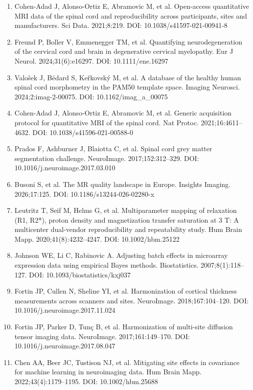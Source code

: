 \documentclass[12pt,a4paper]{article}
\begin{document}
\begin{enumerate}[nosep,leftmargin=*]
\item Cohen-Adad J, Alonso-Ortiz E, Abramovic M, et al. Open-access quantitative MRI data of the spinal cord and reproducibility across participants, sites and manufacturers. Sci Data. 2021;8:219. DOI: 10.1038/s41597-021-00941-8
\item Freund P, Boller V, Emmenegger TM, et al. Quantifying neurodegeneration of the cervical cord and brain in degenerative cervical myelopathy. Eur J Neurol. 2024;31(6):e16297. DOI: 10.1111/ene.16297
\item Valo\v{s}ek J, B\'edard S, Ke\v{r}kovsk\'y M, et al. A database of the healthy human spinal cord morphometry in the PAM50 template space. Imaging Neurosci. 2024;2:imag-2-00075. DOI: 10.1162/imag\_a\_00075
\item Cohen-Adad J, Alonso-Ortiz E, Abramovic M, et al. Generic acquisition protocol for quantitative MRI of the spinal cord. Nat Protoc. 2021;16:4611--4632. DOI: 10.1038/s41596-021-00588-0
\item Prados F, Ashburner J, Blaiotta C, et al. Spinal cord grey matter segmentation challenge. NeuroImage. 2017;152:312--329. DOI: 10.1016/j.neuroimage.2017.03.010
\item Busoni S, et al. The MR quality landscape in Europe. Insights Imaging. 2026;17:125. DOI: 10.1186/s13244-026-02280-x
\item Leutritz T, Seif M, Helms G, et al. Multiparameter mapping of relaxation (R1, R2*), proton density and magnetization transfer saturation at 3 T: A multicenter dual-vendor reproducibility and repeatability study. Hum Brain Mapp. 2020;41(8):4232--4247. DOI: 10.1002/hbm.25122
\item Johnson WE, Li C, Rabinovic A. Adjusting batch effects in microarray expression data using empirical Bayes methods. Biostatistics. 2007;8(1):118--127. DOI: 10.1093/biostatistics/kxj037
\item Fortin JP, Cullen N, Sheline YI, et al. Harmonization of cortical thickness measurements across scanners and sites. NeuroImage. 2018;167:104--120. DOI: 10.1016/j.neuroimage.2017.11.024
\item Fortin JP, Parker D, Tun\c{c} B, et al. Harmonization of multi-site diffusion tensor imaging data. NeuroImage. 2017;161:149--170. DOI: 10.1016/j.neuroimage.2017.08.047
\item Chen AA, Beer JC, Tustison NJ, et al. Mitigating site effects in covariance for machine learning in neuroimaging data. Hum Brain Mapp. 2022;43(4):1179--1195. DOI: 10.1002/hbm.25688

\end{enumerate}
\end{document}
